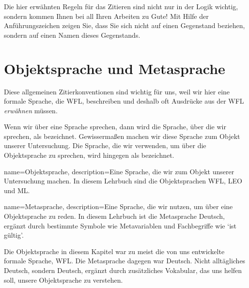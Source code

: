 Die hier erwähnten Regeln für das Zitieren sind nicht nur in der Logik wichtig, sondern kommen Ihnen bei all Ihren Arbeiten zu Gute! Mit Hilfe der Anführungszeichen zeigen Sie, dass Sie sich nicht auf einen Gegenstand beziehen, sondern auf einen Namen dieses Gegenstands.

\section{Objektsprache und Metasprache}
Diese allgemeinen Zitierkonventionen sind wichtig für uns, weil wir hier eine formale Sprache, die WFL, beschreiben und deshalb oft Ausdrücke aus der WFL \emph{erwähnen} müssen. 

Wenn wir über eine Sprache sprechen, dann wird die Sprache, über die wir sprechen, als  bezeichnet. Gewisserma{\ss}en machen wir diese Sprache zum Objekt unserer Untersuchung. Die Sprache, die wir verwenden, um über die Objektsprache zu sprechen, wird hingegen als  bezeichnet.\label{def.metalanguage}

{
name=Objektsprache,
description={Eine Sprache, die wir zum Objekt unserer Untersuchung machen. In diesem Lehrbuch sind die Objektsprachen WFL, LEO und ML.}
}

{
name=Metasprache,
description={Eine Sprache, die wir nutzen, um über eine Objektsprache zu reden. In diesem Lehrbuch ist die Metasprache Deutsch, ergänzt durch bestimmte Symbole wie Metavariablen und Fachbegriffe wie `ist gültig'.}
}

Die Objektsprache in diesem Kapitel war zu meist die von uns entwickelte formale Sprache, WFL. Die Metasprache dagegen war Deutsch. Nicht alltägliches Deutsch, sondern Deutsch, ergänzt durch zusätzliches Vokabular, das uns helfen soll, unsere Objektsprache zu verstehen.

